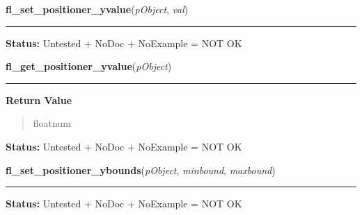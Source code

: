    \vspace{0.5ex}

\hspace{.8\funcindent}\begin{boxedminipage}{\funcwidth}

    \raggedright \textbf{fl\_set\_positioner\_yvalue}(\textit{pObject}, \textit{val})

    \vspace{-1.5ex}

    \rule{\textwidth}{0.5\fboxrule}
\setlength{\parskip}{2ex}
\setlength{\parskip}{1ex}
\textbf{Status:} Untested + NoDoc + NoExample = NOT OK



    \end{boxedminipage}

    \label{xformslib:library:fl_get_positioner_yvalue}

    \vspace{0.5ex}

\hspace{.8\funcindent}\begin{boxedminipage}{\funcwidth}

    \raggedright \textbf{fl\_get\_positioner\_yvalue}(\textit{pObject})

    \vspace{-1.5ex}

    \rule{\textwidth}{0.5\fboxrule}
\setlength{\parskip}{2ex}
\setlength{\parskip}{1ex}
      \textbf{Return Value}
    \vspace{-1ex}

      \begin{quote}
      floatnum

      \end{quote}

\textbf{Status:} Untested + NoDoc + NoExample = NOT OK



    \end{boxedminipage}

    \label{xformslib:library:fl_set_positioner_ybounds}

    \vspace{0.5ex}

\hspace{.8\funcindent}\begin{boxedminipage}{\funcwidth}

    \raggedright \textbf{fl\_set\_positioner\_ybounds}(\textit{pObject}, \textit{minbound}, \textit{maxbound})

    \vspace{-1.5ex}

    \rule{\textwidth}{0.5\fboxrule}
\setlength{\parskip}{2ex}
\setlength{\parskip}{1ex}
\textbf{Status:} Untested + NoDoc + NoExample = NOT OK



    \end{boxedminipage}

